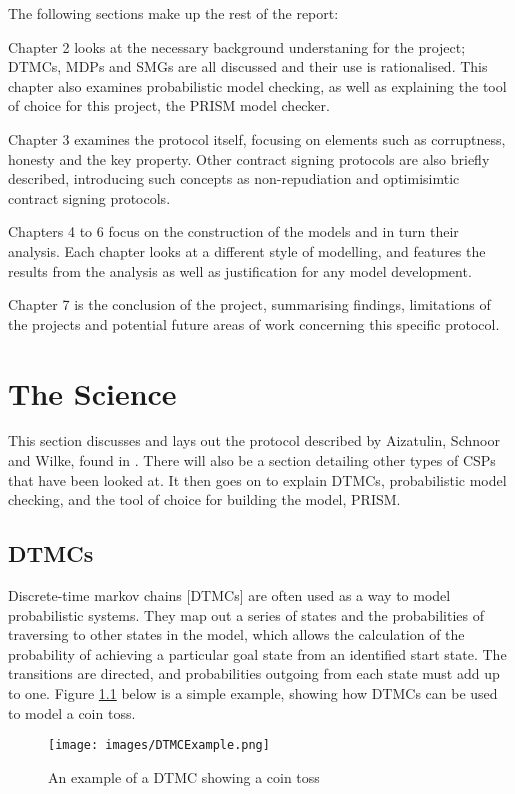 \documentclass{l4proj}
\begin{document}
The following sections make up the rest of the report:

Chapter 2 looks at the necessary background understaning for the project; DTMCs, MDPs and SMGs are all discussed and their use is rationalised. This chapter also examines probabilistic model checking, as well as explaining the tool of choice for this project, the PRISM model checker.

Chapter 3 examines the protocol itself, focusing on elements such as corruptness, honesty and the key property. Other contract signing protocols are also briefly described, introducing such concepts as non-repudiation and optimisimtic contract signing protocols.

Chapters 4 to 6 focus on the construction of the models and in turn their analysis. Each chapter looks at a different style of modelling, and features the results from the analysis as well as justification for any model development.

Chapter 7 is the conclusion of the project, summarising findings, limitations of the projects and potential future areas of work concerning this specific protocol.

\chapter{The Science}
This section discusses and lays out the protocol described by Aizatulin, Schnoor and Wilke, found in \cite{ASW09}. There will also be a section detailing other types of CSPs that have been looked at. It then goes on to explain DTMCs, probabilistic model checking, and the tool of choice for building the model, PRISM.

\section{DTMCs}
Discrete-time markov chains [DTMCs] are often used as a way to model probabilistic systems. They map out a series of states and the probabilities of traversing to other states in the model, which allows the calculation of the probability of achieving a particular goal state from an identified start state. The transitions are directed, and probabilities outgoing from each state must add up to one. Figure \ref{dtmc} below is a simple example, showing how DTMCs can be used to model a coin toss.

\begin{figure}[ht!]
\centering
\texttt{[image: images/DTMCExample.png]}
\caption{An example of a DTMC showing a coin toss}
\label{dtmc}
\end{figure}
\end{document}
